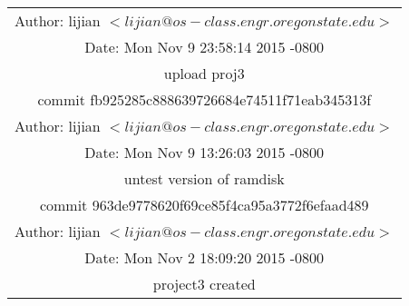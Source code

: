 \documentclass[letterpaper,11pt,titlepage]{article}
\begin{document}
\begin{table}[!hbp]
\begin{tabular}{|c|}

\hline
Author: lijian $<lijian@os-class.engr.oregonstate.edu>$\\
Date:   Mon Nov 9 23:58:14 2015 -0800\\

    upload proj3\\

\hline
commit fb925285c888639726684e74511f71eab345313f\\
Author: lijian $<lijian@os-class.engr.oregonstate.edu>$\\
Date:   Mon Nov 9 13:26:03 2015 -0800\\

    untest version of ramdisk\\

\hline
commit 963de9778620f69ce85f4ca95a3772f6efaad489\\
Author: lijian $<lijian@os-class.engr.oregonstate.edu>$\\
Date:   Mon Nov 2 18:09:20 2015 -0800\\

    project3 created\\

\hline


 
\end{tabular}
\end{table}
\end{document}
